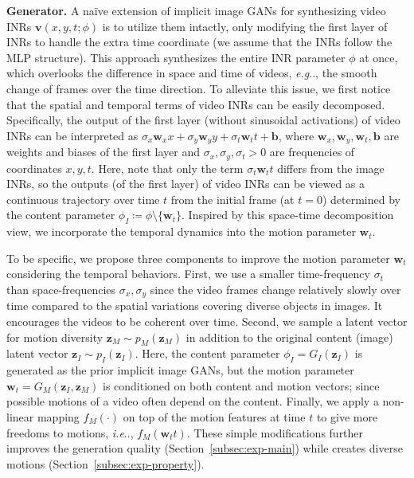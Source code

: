 \documentclass{article} \usepackage{iclr2022_conference,times}
\makeatletter
\DeclareRobustCommand\onedot{\futurelet\@let@token\@onedot}
\def\@onedot{\ifx\@let@token.\else.\null\fi\xspace}
\def\eg{\emph{e.g}\onedot} \def\Eg{\emph{E.g}\onedot}
\def\ie{\emph{i.e}\onedot} \def\Ie{\emph{I.e}\onedot}
\makeatother
\begin{document}
\textbf{Generator.}
A na\"ive extension of implicit image GANs for synthesizing video INRs $\mathbf{v}(x,y,t;\phi)$ is to utilize them intactly, only modifying the first layer of INRs to handle the extra time coordinate (we assume that the INRs follow the MLP structure). This approach synthesizes the entire INR parameter $\phi$ at once, which overlooks the difference in space and time of videos, \eg, the smooth change of frames over the time direction. To alleviate this issue, we first notice that the spatial and temporal terms of video INRs can be easily decomposed. Specifically, the output of the first layer (without sinusoidal activations) of video INRs can be interpreted as $\sigma_x \bm{w}_x x + \sigma_y \bm{w}_y y + \sigma_t \bm{w}_t t + \bm{b}$, where $\bm{w}_x, \bm{w}_y, \bm{w}_t, \bm{b}$ are weights and biases of the first layer and $\sigma_x, \sigma_y,  \sigma_t > 0$ are frequencies of coordinates $x, y, t$. Here, note that only the term $\sigma_t \bm{w}_t t$ differs from the image INRs, so the outputs (of the first layer) of video INRs can be viewed as a continuous trajectory over time $t$ from the initial frame (at $t=0$) determined by the content parameter $\phi_I \coloneqq \phi \setminus \{\bm{w}_t\}$. Inspired by this space-time decomposition view, we incorporate the temporal dynamics into the motion parameter $\bm{w}_t$.

To be specific, we propose three components to improve the motion parameter $\bm{w}_t$ considering the temporal behaviors. First, we use a smaller time-frequency $\sigma_t$ than space-frequencies $\sigma_x, \sigma_y$ since the video frames change relatively slowly over time compared to the spatial variations covering diverse objects in images. It encourages the videos to be coherent over time. Second, we sample a latent vector for motion diversity $\bm{z}_M \sim p_M(\bm{z}_M)$ in addition to the original content (image) latent vector $\bm{z}_I \sim p_I(\bm{z}_I)$. Here, the content parameter $\phi_I = G_I(\bm{z}_I)$ is generated as the prior implicit image GANs, but the motion parameter $\bm{w}_t = G_M(\bm{z}_I, \bm{z}_M)$ is conditioned on both content and motion vectors; since possible motions of a video often depend on the content. Finally, we apply a non-linear mapping $f_M(\cdot)$ on top of the motion features at time $t$ to give more freedoms to motions, \ie, $f_M(\bm{w}_t t)$. These simple modifications further improves the generation quality (Section~\ref{subsec:exp-main}) while creates diverse motions (Section~\ref{subsec:exp-property}).
\end{document}
